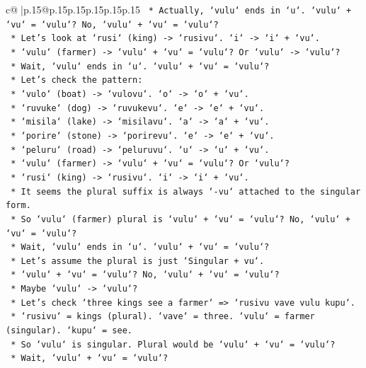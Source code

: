 \documentclass{article}
\begin{document}
{\begin{supertabular}{c@{$\;$}|p{.15\linewidth}@{}p{.15\linewidth}p{.15\linewidth}p{.15\linewidth}p{.15\linewidth}p{.15\linewidth}}
{{{\texttt{        *   Actually, `vulu` ends in `u`. `vulu` + `vu` = `vulu`? No, `vulu` + `vu` = `vulu`?} \\
\texttt{        *   Let's look at `rusi` (king) {-}> `rusivu`. `i` {-}> `i` + `vu`.} \\
\texttt{        *   `vulu` (farmer) {-}> `vulu` + `vu` = `vulu`? Or `vulu` {-}> `vulu`?} \\
\texttt{        *   Wait, `vulu` ends in `u`. `vulu` + `vu` = `vulu`?} \\
\texttt{        *   Let's check the pattern:} \\
\texttt{            *   `vulo` (boat) {-}> `vulovu`. `o` {-}> `o` + `vu`.} \\
\texttt{            *   `ruvuke` (dog) {-}> `ruvukevu`. `e` {-}> `e` + `vu`.} \\
\texttt{            *   `misila` (lake) {-}> `misilavu`. `a` {-}> `a` + `vu`.} \\
\texttt{            *   `porire` (stone) {-}> `porirevu`. `e` {-}> `e` + `vu`.} \\
\texttt{            *   `peluru` (road) {-}> `peluruvu`. `u` {-}> `u` + `vu`.} \\
\texttt{            *   `vulu` (farmer) {-}> `vulu` + `vu` = `vulu`? Or `vulu`?} \\
\texttt{            *   `rusi` (king) {-}> `rusivu`. `i` {-}> `i` + `vu`.} \\
\texttt{        *   It seems the plural suffix is always `{-}vu` attached to the singular form.} \\
\texttt{        *   So `vulu` (farmer) plural is `vulu` + `vu` = `vulu`? No, `vulu` + `vu` = `vulu`?} \\
\texttt{        *   Wait, `vulu` ends in `u`. `vulu` + `vu` = `vulu`?} \\
\texttt{        *   Let's assume the plural is just `Singular + vu`.} \\
\texttt{        *   `vulu` + `vu` = `vulu`? No, `vulu` + `vu` = `vulu`?} \\
\texttt{        *   Maybe `vulu` {-}> `vulu`?} \\
\texttt{        *   Let's check `three kings see a farmer` => `rusivu vave vulu kupu`.} \\
\texttt{        *   `rusivu` = kings (plural). `vave` = three. `vulu` = farmer (singular). `kupu` = see.} \\
\texttt{        *   So `vulu` is singular. Plural would be `vulu` + `vu` = `vulu`?} \\
\texttt{        *   Wait, `vulu` + `vu` = `vulu`?} \\
}}}
\end{supertabular}}
\end{document}
